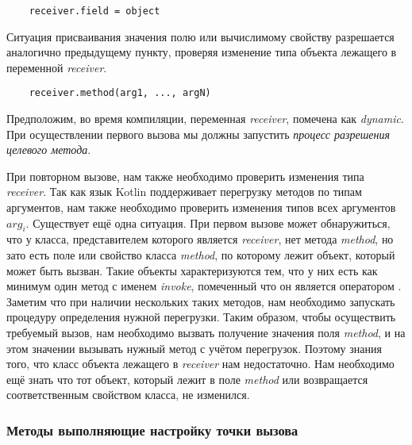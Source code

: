 \begin{verbatim}
    receiver.field = object
\end{verbatim}

Ситуация присваивания значения полю или вычислимому свойству разрешается аналогично предыдущему пункту, проверяя изменение типа объекта лежащего в переменной \textit{receiver}.

\begin{verbatim}
    receiver.method(arg1, ..., argN)
\end{verbatim}

Предположим, во время компиляции, переменная \textit{receiver}, помечена как \textit{dynamic}. При осуществлении первого
вызова мы должны запустить \textit{процесс разрешения целевого метода}.

При повторном вызове, нам также необходимо проверить изменения типа  \textit{receiver}. Так как язык Kotlin поддерживает перегрузку методов по типам аргументов, нам также необходимо проверить изменения типов всех аргументов $arg_i$. Существует ещё одна ситуация. При первом вызове может обнаружиться, что у класса, представителем которого является \textit{receiver}, нет метода \textit{method}, но зато есть поле или свойство класса \textit{method}, по которому лежит объект, который может быть вызван. Такие объекты характеризуются тем, что у них есть как минимум один метод с именем \textit{invoke}, помеченный что он является оператором \cite{book:jemerov2017kotlininAction}. Заметим что при наличии нескольких таких методов, нам необходимо запускать процедуру определения нужной перегрузки. Таким образом, чтобы осуществить требуемый вызов, нам необходимо вызвать получение значения поля \textit{method}, и на этом значении вызывать нужный метод с учётом перегрузок. Поэтому знания того, что класс объекта лежащего в \textit{receiver} нам недостаточно. Нам необходимо ещё знать что тот объект, который лежит в поле \textit{method} или возвращается соответственным свойством класса, не изменился.




\subsubsection{Методы выполняющие настройку точки вызова}

